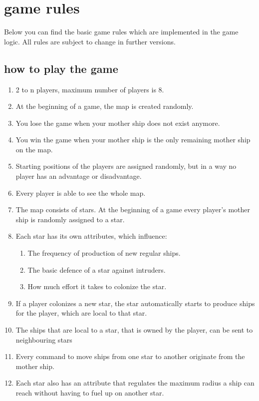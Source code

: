 \chapter{game rules}
Below you can find the basic game rules which are implemented in the game logic. All rules are subject to change in further versions.

\section{how to play the game}
\begin{enumerate}
	\item 2 to n players, maximum number of players is 8.
	\item At the beginning of a game, the map is created randomly.
	\item You lose the game when your mother ship does not exist anymore.
	\item You win the game when your mother ship is the only remaining mother ship on the map.
	\item Starting positions of the players are assigned randomly, but in a way no player has an advantage or disadvantage.
	\item Every player is able to see the whole map.
	\item The map consists of stars. At the beginning of a game every player's mother ship is randomly assigned to a star.
	\item Each star has its own attributes, which influence:  
		\begin{enumerate}[label=\alph*]
		\item The frequency of production of new regular ships.
		\item The basic defence of a star against intruders.
		\item How much effort it takes to colonize the star.
		\end{enumerate}
		\item If a player colonizes a new star, the star automatically starts to produce ships for the player, which are local to that star.
	\item The ships that are local to a star, that is owned by the player, can be sent to neighbouring stars
	\item Every command to move ships from one star to another originate from the mother ship.
	\item Each star also has an attribute that regulates the maximum radius a ship can reach without having to fuel up on another star.

\end{enumerate}
